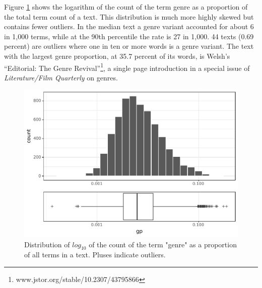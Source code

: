 \documentclass[]{book}
\let\rmarkdownfootnote\footnote%
\def\footnote{\protect\rmarkdownfootnote}
\theoremstyle{definition}
\theoremstyle{definition}
\theoremstyle{definition}
\theoremstyle{remark}
\begin{document}
Figure \ref{fig:gp-hist} shows the logarithm of the count of the term
genre as a proportion of the total term count of a text. This
distribution is much more highly skewed but contains fewer outliers. In
the median text a genre variant accounted for about 6 in 1,000 terms,
while at the 90th percentile the rate is 27 in 1,000. 44 texts (0.69
percent) are outliers where one in ten or more words is a genre variant.
The text with the largest genre proportion, at 35.7 percent of its
words, is Welsh's ``Editorial: The Genre Revival''\footnote{www.jstor.org/stable/10.2307/43795866},
a single page introduction in a special issue of \emph{Literature/Film
Quarterly} on genres.

\begin{figure}

{\centering \includegraphics[width=0.9\linewidth]{03_files/figure-latex/gp-hist-1} 

}

\caption{Distribution of $log_{10}$ of the count of the term "genre" as a proportion of all terms in a text. Pluses indicate outliers.}\label{fig:gp-hist}
\end{figure}
\end{document}
